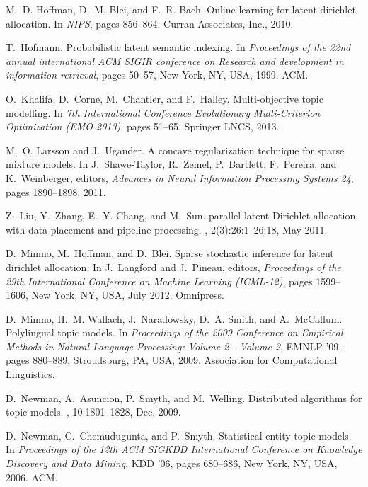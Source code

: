 \documentclass{sig-alternate}
\begin{document}
\begin{thebibliography}{10}
M.~D. Hoffman, D.~M. Blei, and F.~R. Bach.
\newblock Online learning for latent dirichlet allocation.
\newblock In {\em NIPS}, pages 856--864. Curran Associates, Inc., 2010.

T.~Hofmann.
\newblock Probabilistic latent semantic indexing.
\newblock In {\em Proceedings of the 22nd annual international ACM SIGIR
  conference on Research and development in information retrieval}, pages
  50--57, New York, NY, USA, 1999. ACM.

O.~Khalifa, D.~Corne, M.~Chantler, and F.~Halley.
\newblock Multi-objective topic modelling.
\newblock In {\em 7th International Conference Evolutionary Multi-Criterion
  Optimization (EMO 2013)}, pages 51--65. Springer LNCS, 2013.

M.~O. Larsson and J.~Ugander.
\newblock A concave regularization technique for sparse mixture models.
\newblock In J.~Shawe-Taylor, R.~Zemel, P.~Bartlett, F.~Pereira, and
  K.~Weinberger, editors, {\em Advances in Neural Information Processing
  Systems 24}, pages 1890--1898, 2011.

Z.~Liu, Y.~Zhang, E.~Y. Chang, and M.~Sun.
 parallel latent {D}irichlet allocation with data placement
  and pipeline processing.
, 2(3):26:1--26:18, May 2011.

D.~Mimno, M.~Hoffman, and D.~Blei.
\newblock Sparse stochastic inference for latent dirichlet allocation.
\newblock In J.~Langford and J.~Pineau, editors, {\em Proceedings of the 29th
  International Conference on Machine Learning (ICML-12)}, pages 1599--1606,
  New York, NY, USA, July 2012. Omnipress.

D.~Mimno, H.~M. Wallach, J.~Naradowsky, D.~A. Smith, and A.~McCallum.
\newblock Polylingual topic models.
\newblock In {\em Proceedings of the 2009 Conference on Empirical Methods in
  Natural Language Processing: Volume 2 - Volume 2}, EMNLP '09, pages 880--889,
  Stroudsburg, PA, USA, 2009. Association for Computational Linguistics.

D.~Newman, A.~Asuncion, P.~Smyth, and M.~Welling.
\newblock Distributed algorithms for topic models.
, 10:1801--1828, Dec. 2009.

D.~Newman, C.~Chemudugunta, and P.~Smyth.
\newblock Statistical entity-topic models.
\newblock In {\em Proceedings of the 12th ACM SIGKDD International Conference
  on Knowledge Discovery and Data Mining}, KDD '06, pages 680--686, New York,
  NY, USA, 2006. ACM.


\end{thebibliography}
\end{document}
